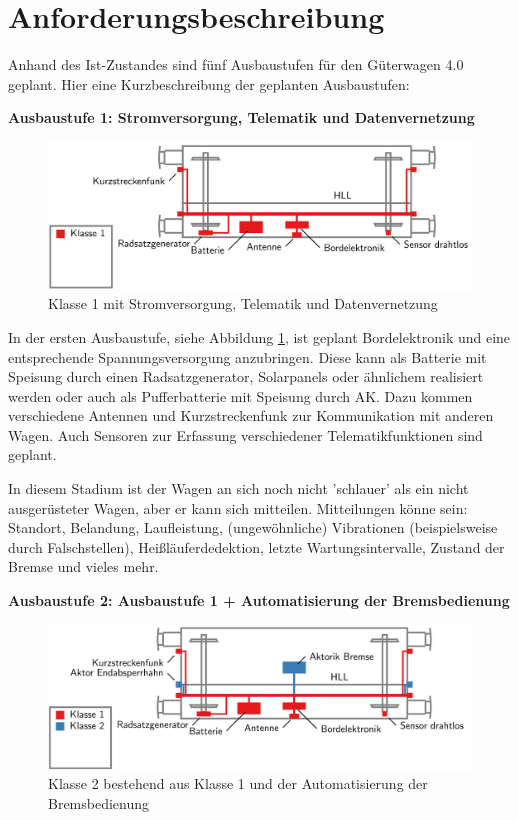 \section{Anforderungsbeschreibung}
Anhand des Ist-Zustandes sind fünf Ausbaustufen für den Güterwagen 4.0 geplant. Hier eine Kurzbeschreibung der geplanten Ausbaustufen:\par
\textbf{Ausbaustufe 1: Stromversorgung, Telematik und Datenvernetzung}\par
\begin{figure}[hbp] 
    \includegraphics[width=\textwidth]{Bilder/Ausbaustufen_1.PNG}
    \caption{Klasse 1 mit Stromversorgung, Telematik und Datenvernetzung }
    \label{fig:Klasse1}
\end{figure} 
In der ersten Ausbaustufe, siehe Abbildung \ref{fig:Klasse1}, ist geplant Bordelektronik und eine entsprechende Spannungsversorgung anzubringen. Diese kann als Batterie mit Speisung durch einen Radsatzgenerator, Solarpanels oder ähnlichem realisiert werden oder auch als Pufferbatterie mit Speisung durch AK. Dazu kommen verschiedene Antennen und Kurzstreckenfunk zur Kommunikation mit anderen Wagen. Auch Sensoren zur Erfassung verschiedener Telematikfunktionen sind geplant.\par
In diesem Stadium ist der Wagen an sich noch nicht 'schlauer' als ein nicht ausgerüsteter Wagen, aber er kann sich mitteilen. Mitteilungen könne sein: Standort, Belandung, Laufleistung, (ungewöhnliche) Vibrationen (beispielsweise durch Falschstellen), Heißläuferdedektion, letzte Wartungsintervalle, Zustand der Bremse und vieles mehr.\par
\textbf{Ausbaustufe 2: Ausbaustufe 1 + Automatisierung der Bremsbedienung}\par
\begin{figure}[htbp] 
    \includegraphics[width=\textwidth]{Bilder/Ausbaustufen_2.PNG}
    \caption{Klasse 2 bestehend aus Klasse 1 und der Automatisierung der Bremsbedienung}
    \label{fig:Klasse2}
\end{figure} 
